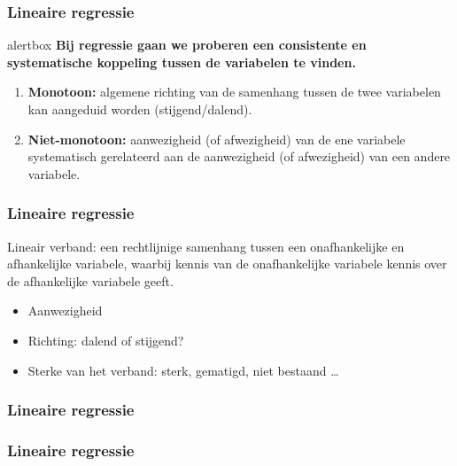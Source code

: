 \documentclass[aspectratio=169]{beamer}
\newcommand{\alertbox}[2][hgblue]{%
  \setbeamercolor{alertbox}{bg=#1,fg=white}
  \begin{beamercolorbox}[sep=2pt,center]{alertbox}
    \textbf{#2}
  \end{beamercolorbox}
}
\begin{document}
\begin{frame}
  \frametitle{Lineaire regressie}
  \alertbox{Bij \textcolor{hgyellow}{regressie} gaan we proberen een \textcolor{hgyellow}{consistente} en \textcolor{hgyellow}{systematische} koppeling tussen de variabelen te vinden.}
  
  
  \begin{enumerate}
    \item \textbf{Monotoon:} algemene richting van de samenhang tussen de twee variabelen kan aangeduid worden (stijgend/dalend).
    \item \textbf{Niet-monotoon:}  aanwezigheid (of afwezigheid) van de ene variabele systematisch gerelateerd aan de aanwezigheid (of afwezigheid) van een andere variabele.
  \end{enumerate}
\end{frame}

\begin{frame}
  \frametitle{Lineaire regressie}
  Lineair verband: een rechtlijnige samenhang tussen een onafhankelijke en afhankelijke variabele, waarbij kennis van de onafhankelijke variabele kennis over de afhankelijke variabele geeft.
  \begin{itemize}
    \item Aanwezigheid
    \item Richting: dalend of stijgend?
    \item Sterke van het verband: sterk, gematigd, niet bestaand \dots
  \end{itemize}
\end{frame}

\begin{frame}
  \frametitle{Lineaire regressie}
  \centering
\end{frame}

\begin{frame}
  \frametitle{Lineaire regressie}
  \centering
\end{frame}
\end{document}
